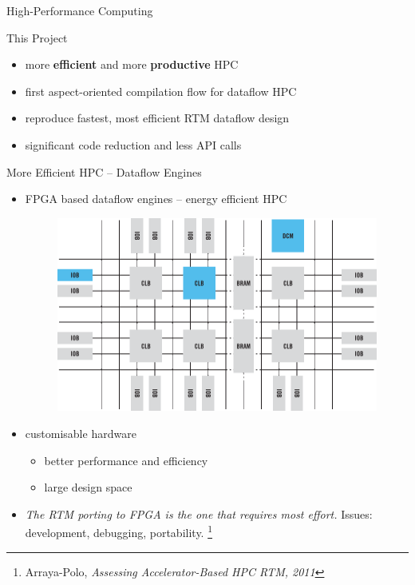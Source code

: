 \begin{frame}{High-Performance Computing}
  \begin{beamerboxesrounded}{This Project}
    \begin{itemize}
    \item more \textbf{efficient} and more \textbf{productive} HPC
    \item first aspect-oriented compilation flow for dataflow HPC
    \item reproduce fastest, most efficient RTM dataflow design
    \item significant code reduction and less API calls
    \end{itemize}
  \end{beamerboxesrounded}
\end{frame}


\begin{frame}{More Efficient HPC -- Dataflow Engines}
\begin{itemize}
  \item FPGA based dataflow engines -- energy efficient HPC
 \begin{figure}[!ht]
   \includegraphics[scale=0.3, clip=true, trim=0 270 295 110]{figs/fpga-block-structure.png}
  \end{figure}
\hspace{0.25cm}
\item customisable hardware
  \begin{itemize}
  \item better performance and efficiency
  \item large design space
  \end{itemize}
\hspace{0.25cm}

\item \emph{The RTM porting to FPGA is the one that requires most
    effort.} Issues: development, debugging, portability. \footnote{Arraya-Polo, \emph{Assessing Accelerator-Based
HPC RTM, 2011}
}
\end{itemize}
\end{frame}

